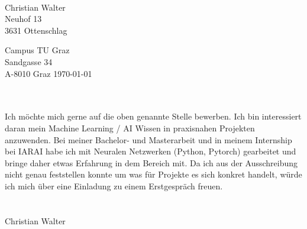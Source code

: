 \documentclass[11pt, a4paper]{article}
\begin{document}
\vspace*{1cm}
\begin{center}
  \\
\end{center}

\vspace{1cm}
Christian Walter\\
Neuhof 13\\
3631 Ottenschlag\\
\vspace{1cm}

Campus TU Graz\\
Sandgasse 34\\
A-8010 Graz
\hfill
\today\\
\vspace{1cm}

\\\\
Ich möchte mich gerne auf die oben genannte Stelle bewerben.
Ich bin interessiert daran mein Machine Learning / AI Wissen in praxisnahen Projekten anzuwenden.
Bei meiner Bachelor- und Masterarbeit und in meinem Internship bei IARAI habe ich mit Neuralen Netzwerken (Python, Pytorch) gearbeitet und bringe daher etwas Erfahrung in dem Bereich mit.
Da ich aus der Ausschreibung nicht genau feststellen konnte um was für Projekte es sich konkret handelt, würde ich mich über eine Einladung zu einem Erstgespräch freuen.\\

\\\\ Christian Walter
\end{document}

